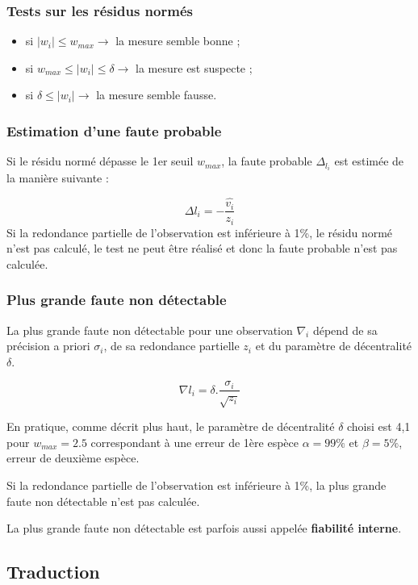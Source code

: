 \documentclass[french]{report}
\begin{document}
\subsubsection{Tests sur les résidus normés}

\begin{itemize}
\item si $\lvert w_i \rvert \leq w_{max} \rightarrow$ la mesure semble bonne ;
\item si $w_{max} \leq \lvert w_i \rvert \leq \delta \rightarrow$ la mesure est suspecte ;
\item si $\delta \leq \lvert w_i \rvert  \rightarrow$ la mesure semble fausse.
\end{itemize}


\subsubsection{Estimation d'une faute probable}

Si le résidu normé dépasse le 1er seuil $w_{max}$, la faute probable $\Delta_{l_{i}}$ est estimée de la manière suivante :

$$\Delta{l_{i}}=-\frac{\hat{v_i}}{z_i}$$
Si la redondance partielle de l'observation est inférieure à 1\%, le résidu normé n'est pas calculé, le test ne peut être réalisé et donc la faute probable n'est pas calculée.


\subsubsection{Plus grande faute non détectable}

La plus grande faute non détectable pour une observation $\nabla_i$ dépend de sa précision a priori $\sigma_i$,
de sa redondance partielle $z_i$ et du paramètre de décentralité $\delta$.

$$\nabla l_i=\delta.\frac{\sigma_i}{\sqrt{z_i}}$$

En pratique, comme décrit plus haut, le paramètre de décentralité $\delta$ choisi est 4,1 pour $w_{max}=2.5$ correspondant à une erreur de 1ère espèce $\alpha=99\%$ et $\beta=5\%$, erreur de deuxième espèce.

Si la redondance partielle de l'observation est inférieure à 1\%, la plus grande faute non détectable n'est pas calculée.

La plus grande faute non détectable est parfois aussi appelée \textbf{fiabilité interne}.


\subsection{Traduction}
\end{document}
